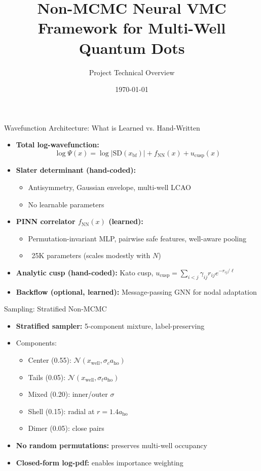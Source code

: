 \documentclass{beamer}
\title{Non-MCMC Neural VMC Framework for Multi-Well Quantum Dots}
\author{Project Technical Overview}
\date{\today}
\begin{document}
\begin{frame}
  \titlepage
\end{frame}

\begin{frame}{Wavefunction Architecture: What is Learned vs. Hand-Written}
\begin{itemize}
  \item \textbf{Total log-wavefunction:}
    \[ \log \Psi(x) = \log |\mathrm{SD}(x_{\mathrm{bf}})| + f_{\mathrm{NN}}(x) + u_{\mathrm{cusp}}(x) \]
  \item \textbf{Slater determinant (hand-coded):}
    \begin{itemize}
      \item Antisymmetry, Gaussian envelope, multi-well LCAO
      \item No learnable parameters
    \end{itemize}
  \item \textbf{PINN correlator $f_{\mathrm{NN}}(x)$ (learned):}
    \begin{itemize}
      \item Permutation-invariant MLP, pairwise safe features, well-aware pooling
      \item ~25K parameters (scales modestly with $N$)
    \end{itemize}
  \item \textbf{Analytic cusp (hand-coded):} Kato cusp, $u_{\mathrm{cusp}} = \sum_{i<j} \gamma_{ij} r_{ij} e^{-r_{ij}/\ell}$
  \item \textbf{Backflow (optional, learned):} Message-passing GNN for nodal adaptation
\end{itemize}
\end{frame}

\begin{frame}{Sampling: Stratified Non-MCMC}
\begin{itemize}
  \item \textbf{Stratified sampler:} 5-component mixture, label-preserving
  \item Components:
    \begin{itemize}
      \item Center (0.55): $\mathcal{N}(x_{\mathrm{well}}, \sigma_c a_{\mathrm{ho}})$
      \item Tails (0.05): $\mathcal{N}(x_{\mathrm{well}}, \sigma_t a_{\mathrm{ho}})$
      \item Mixed (0.20): inner/outer $\sigma$
      \item Shell (0.15): radial at $r=1.4 a_{\mathrm{ho}}$
      \item Dimer (0.05): close pairs
    \end{itemize}
  \item \textbf{No random permutations:} preserves multi-well occupancy
  \item \textbf{Closed-form log-pdf:} enables importance weighting
\end{itemize}
\end{frame}
\end{document}
